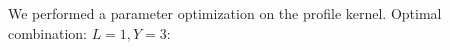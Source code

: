 \documentclass{beamer}
\begin{document}
\begin{frame}{We performed a parameter optimization on the profile kernel.}
Optimal combination: $L=1, Y=3$:
\begin{columns}[t]
\end{columns}
\end{frame}
\end{document}
